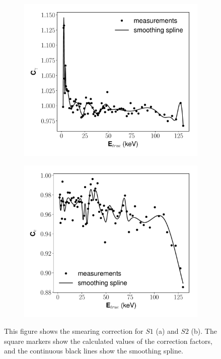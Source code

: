 \begin{figure}[h!]
\centering
\begin{subfigure}{0.5\textwidth}
  \centering
  \includegraphics[width=\textwidth]{Figures/yields_corrections/C14_LN_correction_gfdcm_180Vcm_prelim.pdf}
  \caption{}
\end{subfigure}%
\begin{subfigure}{0.5\textwidth}
  \centering
  \includegraphics[width=\textwidth]{Figures/yields_corrections/C14_QN_correction_gfdcm_180Vcm_prelim.pdf}
\end{subfigure}
\caption{This figure shows the smearing correction for $S1$ (a) and $S2$ (b). The square markers show the calculated values of the correction factors, and the continuous black lines show the smoothing spline.}
\label{fig:lnqn_correction}
\end{figure}

